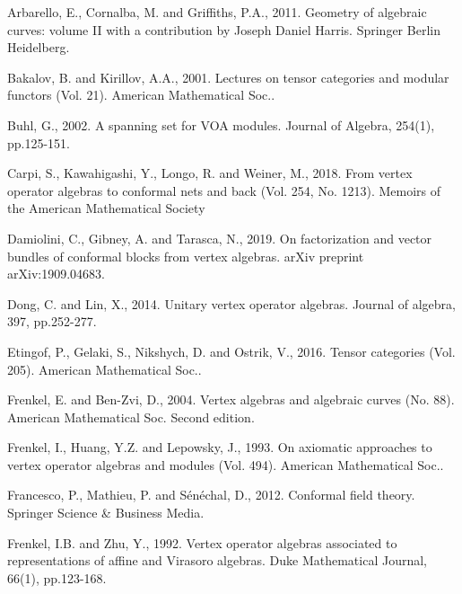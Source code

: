 \documentclass[12pt,a4paper,notitlepage]{article}
\theoremstyle{definition}
\theoremstyle{plain}
\numberwithin{equation}{section}
\begin{document}
\printindex	
	\begin{thebibliography}{999999}
		\footnotesize	


Arbarello, E., Cornalba, M. and Griffiths, P.A., 2011. Geometry of algebraic curves: volume II with a contribution by Joseph Daniel Harris. Springer Berlin Heidelberg.



Bakalov, B. and Kirillov, A.A., 2001. Lectures on tensor categories and modular functors (Vol. 21). American Mathematical Soc..



Buhl, G., 2002. A spanning set for VOA modules. Journal of Algebra, 254(1), pp.125-151.		


Carpi, S., Kawahigashi, Y., Longo, R. and Weiner, M., 2018. From vertex operator algebras to conformal nets and back (Vol. 254, No. 1213). Memoirs of the American Mathematical Society


Damiolini, C., Gibney, A. and Tarasca, N., 2019. On factorization and vector bundles of conformal blocks from vertex algebras. arXiv preprint arXiv:1909.04683.


Dong, C. and Lin, X., 2014. Unitary vertex operator algebras. Journal of algebra, 397, pp.252-277.
	
		
		


Etingof, P., Gelaki, S., Nikshych, D. and Ostrik, V., 2016. Tensor categories (Vol. 205). American Mathematical Soc..



Frenkel, E. and Ben-Zvi, D., 2004. Vertex algebras and algebraic curves (No. 88). American Mathematical Soc. Second edition.


Frenkel, I., Huang, Y.Z. and Lepowsky, J., 1993. On axiomatic approaches to vertex operator algebras and modules (Vol. 494). American Mathematical Soc..



Francesco, P., Mathieu, P. and Sénéchal, D., 2012. Conformal field theory. Springer Science \& Business Media.

Frenkel, I.B. and Zhu, Y., 1992. Vertex operator algebras associated to representations of affine and Virasoro algebras. Duke Mathematical Journal, 66(1), pp.123-168.


\end{thebibliography}
\end{document}
